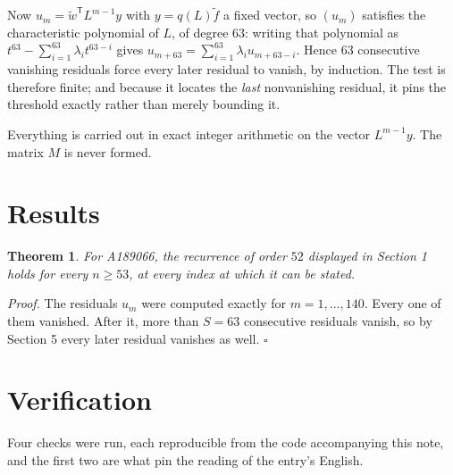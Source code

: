 \documentclass[11pt]{article}
\newtheorem{theorem}{Theorem}
\theoremstyle{definition}
\begin{document}
Now $u_m = \tilde w^{\mathsf T} L^{m-1} y$ with $y = q(L)\tilde f$ a fixed vector, so $(u_m)$ satisfies the characteristic polynomial of $L$, of degree $63$: writing that polynomial as $t^{63} - \sum_{i=1}^{63} \lambda_i t^{63-i}$ gives $u_{m+63} = \sum_{i=1}^{63} \lambda_i u_{m+63-i}$. Hence $63$ consecutive vanishing residuals force every later residual to vanish, by induction. The test is therefore finite; and because it locates the {\itshape last} nonvanishing residual, it pins the threshold exactly rather than merely bounding it.

Everything is carried out in exact integer arithmetic on the vector $L^{m-1}y$. The matrix $M$ is never formed.

\section{Results}

\begin{theorem} For A189066, the recurrence of order $52$ displayed in Section 1 holds for every $n \ge 53$, at every index at which it can be stated.\end{theorem}

{\itshape Proof.} The residuals $u_m$ were computed exactly for $m = 1,\dots,140$. Every one of them vanished. After it, more than $S = 63$ consecutive residuals vanish, so by Section 5 every later residual vanishes as well. $\square$

\section{Verification}

Four checks were run, each reproducible from the code accompanying this note, and the first two are what pin the reading of the entry's English.
\end{document}
